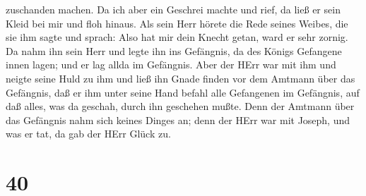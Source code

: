 zuschanden machen.  Da ich aber ein Geschrei machte und
rief, da ließ er sein Kleid bei mir und floh hinaus.  Als
sein Herr hörete die Rede seines Weibes, die sie ihm sagte und sprach:
Also hat mir dein Knecht getan, ward er sehr zornig.  Da
nahm ihn sein Herr und legte ihn ins Gefängnis, da des Königs Gefangene
innen lagen; und er lag allda im Gefängnis.  Aber der HErr
war mit ihm und neigte seine Huld zu ihm und ließ ihn Gnade finden vor
dem Amtmann über das Gefängnis,  daß er ihm unter seine
Hand befahl alle Gefangenen im Gefängnis, auf daß alles, was da geschah,
durch ihn geschehen mußte.  Denn der Amtmann über das
Gefängnis nahm sich keines Dinges an; denn der HErr war mit Joseph, und
was er tat, da gab der HErr Glück zu.

\hypertarget{section-39}{%
\section{40}\label{section-39}}

